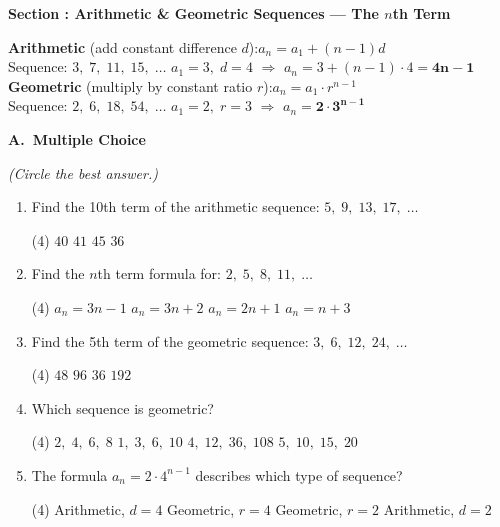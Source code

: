 \documentclass[12pt,letterpaper]{article}
\newcounter{sectionnum}
\newcommand{\worksheetsection}[1]{%
  \stepcounter{sectionnum}%
  \vspace{10pt}%
  \noindent\colorbox{navyblue}{%
    \parbox{\dimexpr\linewidth-2\fboxsep\relax}{%
      \strut\color{white}\bfseries\large
      Section \thesectionnum: #1%
    }%
  }%
  \par\vspace{4pt}%
}
\newcommand{\worksheetsubsection}[1]{%
  \vspace{4pt}%
  {\noindent\small\bfseries\color{navyblue}#1}\par\vspace{2pt}%
}
\begin{document}
\newpage
\worksheetsection{Arithmetic \& Geometric Sequences --- The $n$th Term}

\begin{tcolorbox}[examplebox]
  \textbf{Arithmetic} (add constant difference $d$):\quad $a_n = a_1 + (n-1)d$\\
  \quad Sequence: $3,\;7,\;11,\;15,\;\ldots$ \quad $a_1=3,\;d=4$
  \quad $\Rightarrow$ \quad $a_n = 3+(n-1)\cdot 4 = \boldsymbol{4n-1}$\\[6pt]
  \textbf{Geometric} (multiply by constant ratio $r$):\quad $a_n = a_1 \cdot r^{n-1}$\\
  \quad Sequence: $2,\;6,\;18,\;54,\;\ldots$ \quad $a_1=2,\;r=3$
  \quad $\Rightarrow$ \quad $a_n = \boldsymbol{2\cdot 3^{n-1}}$
\end{tcolorbox}

\worksheetsubsection{A.\ Multiple Choice} \textit{(Circle the best answer.)}

\begin{enumerate}[label=\textbf{\arabic*.}, leftmargin=*, itemsep=10pt]

  \item Find the 10th term of the arithmetic sequence: $5,\;9,\;13,\;17,\;\ldots$
  \begin{tasks}(4)
    \task $40$
    \task $41$
    \task $45$
    \task $36$
  \end{tasks}

  \item Find the $n$th term formula for: $2,\;5,\;8,\;11,\;\ldots$
  \begin{tasks}(4)
    \task $a_n = 3n-1$
    \task $a_n = 3n+2$
    \task $a_n = 2n+1$
    \task $a_n = n+3$
  \end{tasks}

  \item Find the 5th term of the geometric sequence: $3,\;6,\;12,\;24,\;\ldots$
  \begin{tasks}(4)
    \task $48$
    \task $96$
    \task $36$
    \task $192$
  \end{tasks}

  \item Which sequence is geometric?
  \begin{tasks}(4)
    \task $2,\;4,\;6,\;8$
    \task $1,\;3,\;6,\;10$
    \task $4,\;12,\;36,\;108$
    \task $5,\;10,\;15,\;20$
  \end{tasks}

  \item The formula $a_n = 2\cdot 4^{n-1}$ describes which type of sequence?
  \begin{tasks}(4)
    \task Arithmetic, $d=4$
    \task Geometric, $r=4$
    \task Geometric, $r=2$
    \task Arithmetic, $d=2$
  \end{tasks}

\end{enumerate}
\end{document}
